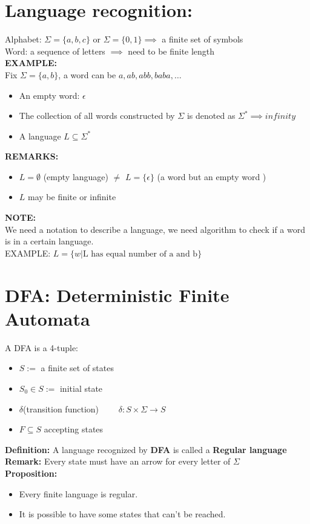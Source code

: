 \documentclass [9 pt]{article}
\theoremstyle{definition}
\begin{document}
\section*{Language recognition:}
Alphabet: $\Sigma = \{a, b, c \} \text{ or }\Sigma = \{0, 1 \} \implies  $ a finite set of symbols\\
Word: a sequence of letters  $\implies $ need to be finite length
\\
\newline
\textbf{EXAMPLE: }\\
Fix $\Sigma = \{a, b \}$, a word can be $a, ab, abb, baba, \ldots$
\begin{itemize}
	\item An empty word: $\epsilon$
	\item The collection of all words constructed by $\Sigma$ is denoted as $\Sigma^{*} \implies infinity $  
	\item A language $L \subseteq \Sigma^{*}$
\end{itemize}
\textbf{REMARKS:}
\begin{itemize}
	\item $L  = \emptyset $ (empty language) $\neq$ $L = \{ \epsilon \}$ (a word but an empty word )
	\item $L$ may be finite or infinite
\end{itemize}
\newpage
\textbf{NOTE:}\\
We need a notation to describe a language, we need algorithm to check if a word is in a certain language.\\
EXAMPLE: $L = \{w | \text{L has equal number of a and b} \}$

\section*{DFA: Deterministic Finite Automata}
A DFA is a 4-tuple:
\begin{itemize}
	\item $S := $ a finite set of states
	\item $S_0 \in S :=$ initial state
	\item $\delta  $(transition function) $\quad \quad \delta: S\times \Sigma \to S$ 
	\item  $F \subseteq S$ accepting states 
\end{itemize}

\textbf{Definition: } A language recognized by \textbf{DFA} is called a \textbf{Regular language}\\
\textbf{Remark: } Every state must have an arrow for every letter of $\Sigma$
\\
\newline
\textbf{Proposition: }
\begin{itemize}
	\item Every finite language is regular.
	\item It is possible to have some states that can't be reached.
\end{itemize} 
\end{document}

